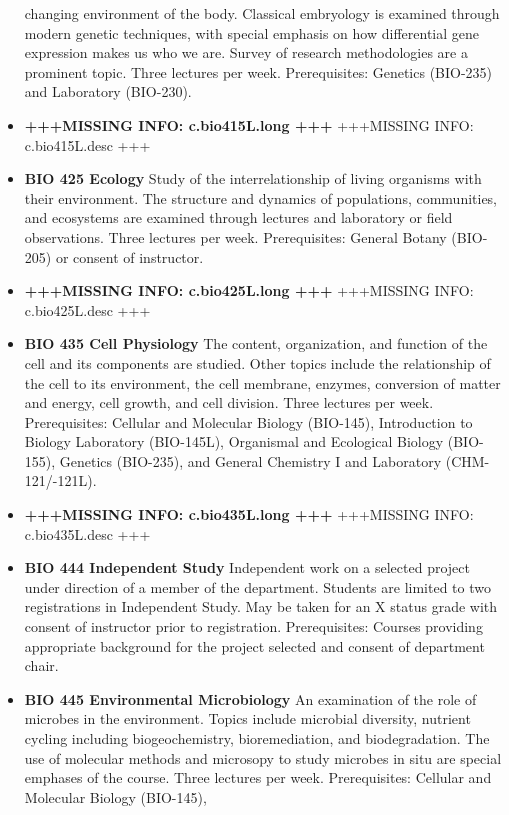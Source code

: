 \documentclass[
  letterpaper,
]{scrbook}
\begin{document}
\begin{itemize}
  changing environment of the body. Classical embryology is examined
  through modern genetic techniques, with special emphasis on how
  differential gene expression makes us who we are. Survey of research
  methodologies are a prominent topic. Three lectures per week.
  Prerequisites: Genetics (BIO-235) and Laboratory (BIO-230).
\item
  \textbf{+++MISSING INFO: c.bio415L.long +++} +++MISSING INFO:
  c.bio415L.desc +++
\item
  \textbf{BIO 425 Ecology} Study of the interrelationship of living
  organisms with their environment. The structure and dynamics of
  populations, communities, and ecosystems are examined through lectures
  and laboratory or field observations. Three lectures per week.
  Prerequisites: General Botany (BIO-205) or consent of instructor.
\item
  \textbf{+++MISSING INFO: c.bio425L.long +++} +++MISSING INFO:
  c.bio425L.desc +++
\item
  \textbf{BIO 435 Cell Physiology} The content, organization, and
  function of the cell and its components are studied. Other topics
  include the relationship of the cell to its environment, the cell
  membrane, enzymes, conversion of matter and energy, cell growth, and
  cell division. Three lectures per week. Prerequisites: Cellular and
  Molecular Biology (BIO-145), Introduction to Biology Laboratory
  (BIO-145L), Organismal and Ecological Biology (BIO-155), Genetics
  (BIO-235), and General Chemistry I and Laboratory (CHM-121/-121L).
\item
  \textbf{+++MISSING INFO: c.bio435L.long +++} +++MISSING INFO:
  c.bio435L.desc +++
\item
  \textbf{BIO 444 Independent Study} Independent work on a selected
  project under direction of a member of the department. Students are
  limited to two registrations in Independent Study. May be taken for an
  X status grade with consent of instructor prior to registration.
  Prerequisites: Courses providing appropriate background for the
  project selected and consent of department chair.
\item
  \textbf{BIO 445 Environmental Microbiology} An examination of the role
  of microbes in the environment. Topics include microbial diversity,
  nutrient cycling including biogeochemistry, bioremediation, and
  biodegradation. The use of molecular methods and microsopy to study
  microbes in situ are special emphases of the course. Three lectures
  per week. Prerequisites: Cellular and Molecular Biology (BIO-145),

\end{itemize}
\end{document}
